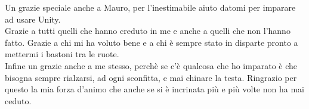 Un grazie speciale anche a Mauro, per l'inestimabile aiuto datomi per imparare ad usare Unity. \\

Grazie a tutti quelli che hanno creduto in me e anche a quelli che non l'hanno fatto. Grazie a chi mi ha voluto bene e a chi è sempre stato in disparte pronto a mettermi i bastoni tra le ruote. \\     

Infine un grazie anche a me stesso, perchè se c'è qualcosa che ho imparato è che bisogna sempre rialzarsi, ad ogni sconfitta, e mai chinare la testa. Ringrazio per questo la mia forza d'animo che anche se si è incrinata più e più volte non ha mai ceduto. 